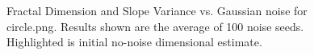 \documentclass[12pt, oneside]{book}
\begin{document}
\begin{figure}[!b]
  \centering
  \caption[Fractal Dimension and Slope Variance vs. Gaussian noise for circle.png.]{Fractal Dimension and Slope Variance vs. Gaussian noise for circle.png.  Results shown are the average of 100 noise seeds.  Highlighted is initial no-noise dimensional estimate.}
  \label{fig:circle_gaussian_result}
\end{figure}
\end{document}
